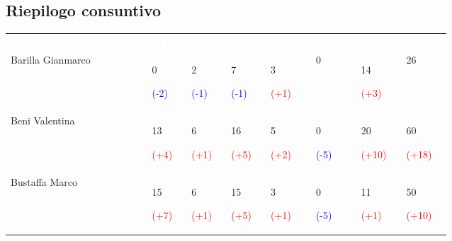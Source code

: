\subsection{Riepilogo consuntivo}
{\renewcommand{\arraystretch}{2.0}        
        \begin{tabular}{P{0.25\linewidth}P{0.07\linewidth}P{0.07\linewidth}P{0.07\linewidth}P{0.08\linewidth}P{0.08\linewidth}P{0.08\linewidth}P{0.08\linewidth}}
            \textcolor{white}{\textbf{Nominativo}} & \textcolor{white}{\textbf{RE}} &
            \textcolor{white}{\textbf{AM}} & \textcolor{white}{\textbf{AN}} &
            \textcolor{white}{\textbf{PT}} & \textcolor{white}{\textbf{PG}} &
            \textcolor{white}{\textbf{VE}} & \textcolor{white}{\textbf{Tot.}}\\
        
            Barilla Gianmarco & 
            0 \par \textcolor{blue}{(-2)} & 
            2 \par \textcolor{blue}{(-1)} & 
            7 \par \textcolor{blue}{(-1)} & 
            3 \par \textcolor{red}{(+1)} & 
            0 & 
            14 \par \textcolor{red}{(+3)} &
            26 \\
            
            Beni Valentina & 
            13 \par \textcolor{red}{(+4)} & 
            6 \par \textcolor{red}{(+1)} & 
            16 \par \textcolor{red}{(+5)} & 
            5 \par \textcolor{red}{(+2)} &
            0 \par \textcolor{blue}{(-5)}&
            20 \par \textcolor{red}{(+10)}& 
            60 \par \textcolor{red}{(+18)}\\

            Bustaffa Marco & 
            15 \par \textcolor{red}{(+7)}& 
            6 \par \textcolor{red}{(+1)} &      
            15 \par \textcolor{red}{(+5)} & 
            3 \par \textcolor{red}{(+1)} &
            0 \par \textcolor{blue}{(-5)} &
            11 \par \textcolor{red}{(+1)}&
            50 \par \textcolor{red}{(+10)}\\


\end{tabular}}
